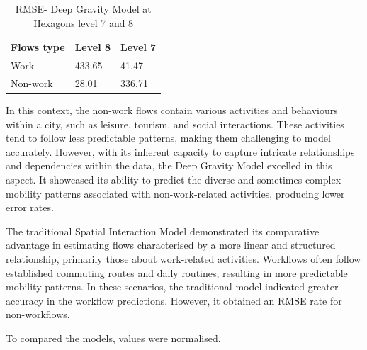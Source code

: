        \begin{table}[H]
        \centering
        \begin{tabular}{@{}lll@{}}
        \toprule
        \textbf{Flows type} & \textbf{Level 8} & \textbf{Level 7} \\ \midrule
        Work                & 433.65                & 41.47                          \\
        Non-work            & 28.01                 & 336.71                          \\ \bottomrule
        \end{tabular}
            \caption{RMSE- Deep Gravity Model at Hexagons level 7 and 8}
            \label{table: RMSE_DG}
        \end{table}
    
    
    In this context, the non-work flows contain various activities and behaviours within a city, such as leisure, tourism, and social interactions. These activities tend to follow less predictable patterns, making them challenging to model accurately. However, with its inherent capacity to capture intricate relationships and dependencies within the data, the Deep Gravity Model excelled in this aspect. It showcased its ability to predict the diverse and sometimes complex mobility patterns associated with non-work-related activities, producing lower error rates.
    
    The traditional Spatial Interaction Model demonstrated its comparative advantage in estimating flows characterised by a more linear and structured relationship, primarily those about work-related activities. Workflows often follow established commuting routes and daily routines, resulting in more predictable mobility patterns. In these scenarios, the traditional model indicated greater accuracy in the workflow predictions. However, it obtained an RMSE rate for non-workflows.
        
    To compared the models, values were normalised.
        
